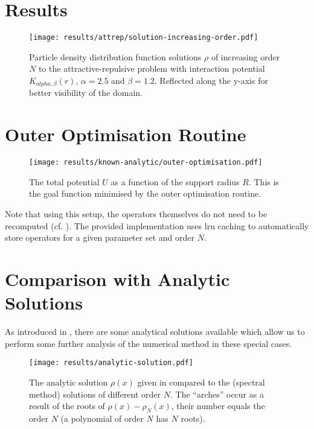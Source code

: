 \section{Results}
\begin{figure}[H]
  \centering
  \label{fig:solution-increasing-order}
  \texttt{[image: results/attrep/solution-increasing-order.pdf]}
  \caption[Solutions of increasing orders]{Particle density distribution function solutions $\rho$ of increasing order $N$ to the attractive-repulsive problem with interaction potential $K_{alpha, \beta}(r)$, $\alpha = 2.5$ and $\beta = 1.2$. Reflected along the y-axis for better visibility of the domain.}
\end{figure}

\section{Outer Optimisation Routine}
\begin{figure}[H]
  \centering
  \label{fig:outer-optimisation}
  \texttt{[image: results/known-analytic/outer-optimisation.pdf]}
  \caption[Outer Optimisation Routine]{The total potential $U$ as a function of the support radius $R$. This is the goal function minimised by the outer optimisation routine.}
\end{figure}

Note that using this setup, the operators themselves do not need to be recomputed (cf. ).
The provided implementation uses \gls{lru} caching to automatically store operators for a given parameter set and order $N$.

\section{Comparison with Analytic Solutions}
As introduced in , there are some analytical solutions available which allow us to perform some further analysis of the numerical method in these special cases.

\begin{figure}[H]
  \centering
  \label{fig:analytic-solution}
  \texttt{[image: results/analytic-solution.pdf]}
  \caption[Comparison with analytical solutions and error]{
    The analytic solution $\rho(x)$ given in  compared to the (spectral method) solutions of different order $N$.
    The ``arches'' occur as a result of the roots of $\rho(x) - \rho_N(x)$, their number equals the order $N$ (a polynomial of order $N$ has $N$ roots).
  }
\end{figure}

